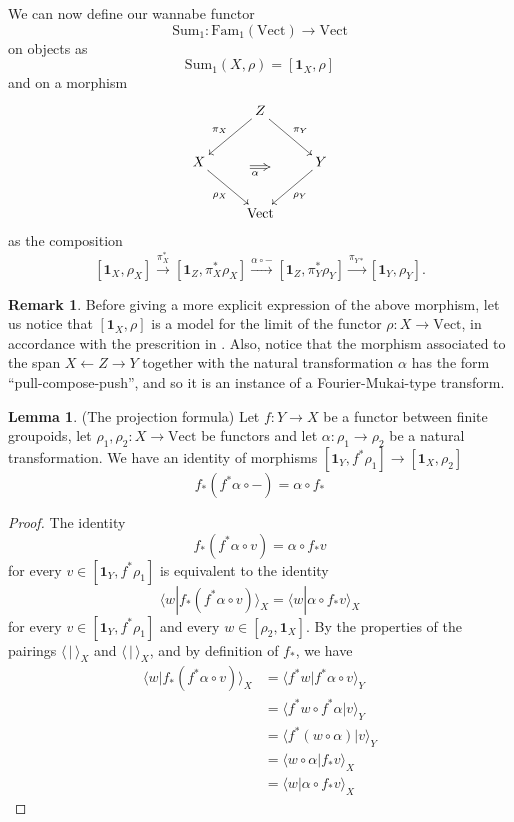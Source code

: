 \documentclass[12pt]{scrartcl}
\theoremstyle{definition}
\newtheorem{lemma}[definition]{Lemma}
\newtheorem{remark}[definition]{Remark}
\numberwithin{equation}{section}
\numberwithin{definition}{section}
\numberwithin{figure}{section}
\begin{document}
We can now define our wannabe functor
\[
\mathrm{Sum}_1\colon \mathrm{Fam}_1(\mathrm{Vect})\to \mathrm{Vect}
\]
on objects as 
\[
\mathrm{Sum}_1(X,\rho)=[\mathbf{1}_X,\rho]
\]
and on a morphism 
\[
\xymatrix{
&Z\ar[dl]_{\pi_X}\ar[dr]^{\pi_Y}&\\
X\ar[dr]_{\rho_X}&&Y\ar[dl]^{\rho_Y}\\
&\mathrm{Vect}
\ar@{=>}_{\alpha\phantom{m}}(13,-14);(18,-14)
}
\]
as the composition
\[
[\mathbf{1}_X,\rho_X]\xrightarrow{\pi_X^*} [\mathbf{1}_Z,\pi_X^*\rho_X]\xrightarrow{\alpha\circ-}  [\mathbf{1}_Z,\pi_Y^*\rho_Y] \xrightarrow{\pi_{Y*}} [\mathbf{1}_Y,\rho_Y].
\]

\begin{remark}
Before giving a more explicit expression of the above morphism, let us notice that $[\mathbf{1}_X,\rho]$ is a model for the limit of the functor $\rho\colon X\to \mathrm{Vect}$, in accordance with the prescrition in \cite{FHLT}. Also, notice that the morphism associated to the span $X\leftarrow Z\to Y$ together with the natural transformation $\alpha$ has the form ``pull-compose-push'', and so it is an instance of a Fourier-Mukai-type transform.
\end{remark}



\begin{lemma} (The projection formula)
Let $f\colon Y\to X$ be a functor between finite groupoids, let $\rho_1,\rho_2\colon X\to \mathrm{Vect}$ be functors and let $\alpha\colon \rho_1\to\rho_2$ be a natural transformation. We have an identity of morphisms $[\mathbf{1}_Y,f^*\rho_1]\to [\mathbf{1}_X,\rho_2]$
\[
f_*(f^*\alpha\circ -) = \alpha\circ f_*
\] 
\end{lemma}
\begin{proof}
The identity
\[
f_*(f^*\alpha\circ v) = \alpha\circ f_*v
\]
for every $v\in [\mathbf{1}_Y,f^*\rho_1]$ is equivalent to the identity
\[
\langle w| f_*(f^*\alpha\circ v)\rangle_X = \langle w|\alpha\circ f_*v\rangle_X
\]
for every $v\in [\mathbf{1}_Y,f^*\rho_1]$ and every $w\in [\rho_2,\mathbf{1}_X]$. By the properties of the pairings $\langle\,|\,\rangle_X$ and $\langle\,|\,\rangle_X$, and by definition of $f_*$, we have
\begin{align*}
\langle w| f_*(f^*\alpha\circ v)\rangle_X&=\langle f^*w| f^*\alpha\circ v\rangle_Y\\
&=\langle f^*w\circ f^*\alpha| v\rangle_Y\\
&=\langle f^*(w\circ \alpha)| v\rangle_Y\\
&=\langle w\circ \alpha| f_*v\rangle_X\\
&=\langle w| \alpha \circ f_*v\rangle_X
\end{align*}
\end{proof}
\end{document}
